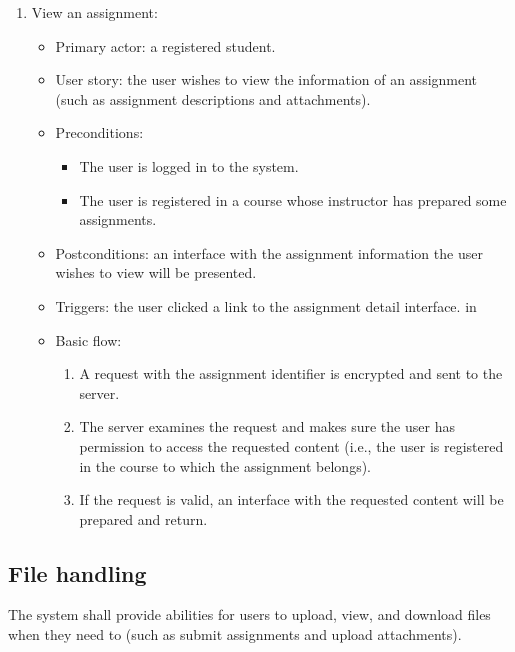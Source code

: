 \begin{enumerate}
\item View an assignment:
\begin{itemize}
    \item Primary actor: a registered student.
    \item User story: the user wishes to view the information of an assignment
     (such as assignment descriptions and attachments).
    \item Preconditions:
        \begin{itemize}
            \item The user is logged in to the system.
            \item The user is registered in a course whose instructor has
                prepared some assignments.
        \end{itemize}
    \item Postconditions: an interface with the assignment information the user
        wishes to view will be presented.
    \item Triggers: the user clicked a link to the assignment detail interface.
     in
    \item Basic flow:
        \begin{enumerate}
            \item A request with the assignment identifier is encrypted and
                sent to the server.
            \item The server examines the request and makes sure the user has
                permission to access the requested content (i.e., the user is
                registered in the course to which the assignment belongs).
            \item If the request is valid, an interface with the requested
                content will be prepared and return.
        \end{enumerate}
\end{itemize}
\end{enumerate}

\subsection{File handling}
The system shall provide abilities for users to upload, view, and download
files when they need to (such as submit assignments and upload attachments).

